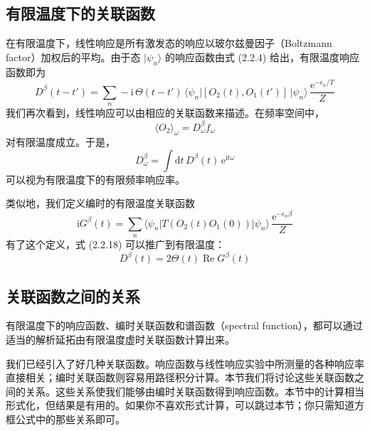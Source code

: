 \subsection{有限温度下的关联函数}

在有限温度下，线性响应是所有激发态的响应以玻尔兹曼因子（Boltzmann factor）加权后的平均。由于态 $|\psi_n\rangle$ 的响应函数由式 (2.2.4) 给出，有限温度响应函数即为
\begin{equation*}
D^{\beta}(t-t') = \sum_n -\mathrm{i}\,\Theta(t-t')\,\langle\psi_n|[O_2(t), O_1(t')]\,|\psi_n\rangle\, \frac{\mathrm{e}^{-\epsilon_n/T}}{Z}
\end{equation*}
我们再次看到，线性响应可以由相应的关联函数来描述。在频率空间中，
\begin{equation*}
\langle O_2\rangle_{\omega} = D^{\beta}_{\omega} f_{\omega}
\end{equation*}
对有限温度成立。于是，
\begin{equation*}
D^{\beta}_{\omega} = \int \mathrm{d}t\, D^{\beta}(t)\,\mathrm{e}^{\mathrm{i}t\omega}
\end{equation*}
可以视为有限温度下的有限频率响应率。

类似地，我们定义编时的有限温度关联函数
\begin{equation*}
\mathrm{i}G^{\beta}(t) = \sum_n \langle\psi_n|T(O_2(t)O_1(0))|\psi_n\rangle\, \frac{\mathrm{e}^{-\epsilon_n\beta}}{Z}
\end{equation*}
有了这个定义，式 (2.2.18) 可以推广到有限温度：
\begin{equation*}
D^{\beta}(t) = 2\Theta(t)\operatorname{Re} G^{\beta}(t) \tag{2.2.23}
\end{equation*}

\subsection{关联函数之间的关系}

\begin{keypoints}
\item 有限温度下的响应函数、编时关联函数和谱函数（spectral function），都可以通过适当的解析延拓由有限温度虚时关联函数计算出来。
\end{keypoints}

我们已经引入了好几种关联函数。响应函数与线性响应实验中所测量的各种响应率直接相关；编时关联函数则容易用路径积分计算。本节我们将讨论这些关联函数之间的关系。这些关系使我们能够由编时关联函数得到响应函数。本节中的计算相当形式化，但结果是有用的。如果你不喜欢形式计算，可以跳过本节；你只需知道方框公式中的那些关系即可。

